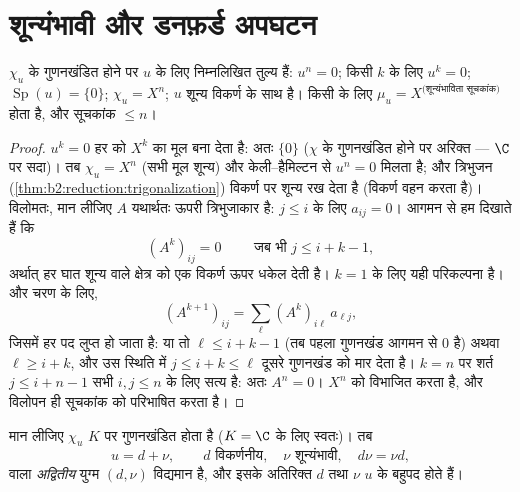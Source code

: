 \section{शून्यंभावी और डनफ़र्ड अपघटन}

\begin{proposition}[शून्यंभावी अंतःरूपांतरण]\label{prop:b2:reduction:nilpotent}
$\chi_u$ के गुणनखंडित होने पर $u$ के लिए निम्नलिखित तुल्य हैं: $u^n =
0$; किसी
$k$ के लिए $u^k = 0$; $\operatorname{Sp}(u) = \{0\}$; $\chi_u
= X^n$; $u$ शून्य विकर्ण के साथ  है।
किसी  के लिए $\mu_u = X^{\text{(शून्यंभाविता
सूचकांक)}}$ होता है, और सूचकांक $\leq n$।
\end{proposition}

\begin{proof}
$u^k = 0$ हर  को $X^k$ का मूल बना देता है: अतः  $\{0\}$ ($\chi$
के गुणनखंडित होने पर अरिक्त --- $\C$ पर सदा)। तब $\chi_u =
X^n$ (सभी मूल शून्य) और
केली--हैमिल्टन से $u^n = 0$ मिलता है; और त्रिभुजन (\cref{thm:b2:reduction:trigonalization}) विकर्ण पर शून्य रख
देता है (विकर्ण  वहन करता है)। विलोमतः, मान लीजिए $A$
यथार्थतः ऊपरी त्रिभुजाकार है: $j \leq i$ के लिए $a_{ij} = 0$। आगमन से हम दिखाते हैं कि
\[
(A^k)_{ij} = 0 \qquad \text{ जब भी } j \leq i + k - 1,
\]
अर्थात् हर घात शून्य वाले क्षेत्र को एक विकर्ण ऊपर धकेल देती है। $k = 1$
के लिए यही परिकल्पना है। और चरण के लिए,
\[
(A^{k+1})_{ij} = \sum_{\ell} (A^k)_{i\ell}\,a_{\ell j} ,
\]
जिसमें हर पद लुप्त हो जाता है: या तो $\ell \leq i + k - 1$ (तब पहला गुणनखंड आगमन से $0$
है) अथवा $\ell \geq i + k$, और उस स्थिति में $j \leq i + k \leq \ell$ दूसरे गुणनखंड को मार देता है।
$k = n$ पर शर्त $j \leq i + n - 1$ सभी $i, j \leq n$ के लिए सत्य है: अतः $A^n =
0$। 
$X^n$ को विभाजित करता है, और विलोपन ही सूचकांक को परिभाषित करता है।
\end{proof}

\begin{theorem}\label{thm:b2:reduction:dunford}
मान लीजिए $\chi_u$ $K$ पर गुणनखंडित होता है ($K = \C$ के लिए स्वतः)। तब
\[
u = d + \nu, \qquad d \text{ विकर्णनीय}, \quad \nu
\text{ शून्यंभावी}, \quad d\nu = \nu d ,
\]
वाला \emph{अद्वितीय} युग्म $(d, \nu)$ विद्यमान है, और इसके अतिरिक्त $d$ तथा
$\nu$ $u$ के बहुपद होते हैं।
\end{theorem}

